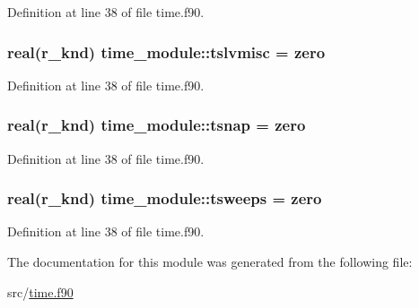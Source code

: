 Definition at line 38 of file time.\-f90.

\hypertarget{classtime__module_ae8ff3e794ae2fcb536002fc5ba9e6c72}{
\subsubsection[{tslvmisc}]{\setlength{\rightskip}{0pt plus 5cm}real(r\-\_\-knd) time\-\_\-module\-::tslvmisc = zero}}\label{classtime__module_ae8ff3e794ae2fcb536002fc5ba9e6c72}


Definition at line 38 of file time.\-f90.

\hypertarget{classtime__module_aa8ee658575005edd9d28a62a468cfde2}{
\subsubsection[{tsnap}]{\setlength{\rightskip}{0pt plus 5cm}real(r\-\_\-knd) time\-\_\-module\-::tsnap = zero}}\label{classtime__module_aa8ee658575005edd9d28a62a468cfde2}


Definition at line 38 of file time.\-f90.

\hypertarget{classtime__module_aac45a44eaf19a7bea1d8f553c3a552be}{
\subsubsection[{tsweeps}]{\setlength{\rightskip}{0pt plus 5cm}real(r\-\_\-knd) time\-\_\-module\-::tsweeps = zero}}\label{classtime__module_aac45a44eaf19a7bea1d8f553c3a552be}


Definition at line 38 of file time.\-f90.



The documentation for this module was generated from the following file\-:\begin{DoxyCompactItemize}
\item 
src/\hyperlink{time_8f90}{time.\-f90}\end{DoxyCompactItemize}
